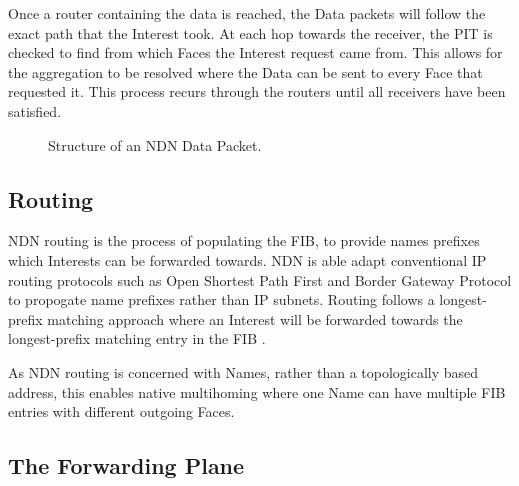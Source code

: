 \documentclass[12pt]{report}
\begin{document}
Once a router containing the data is reached, the Data packets will follow the exact path that the Interest took. At each hop towards the receiver, the PIT is checked to find from which Faces the Interest request came from. This allows for the aggregation to be resolved where the Data can be sent to every Face that requested it. This process recurs through the routers until all receivers have been satisfied.\cite{zhang_named_2014}
\begin{figure}[h!]
    \centering
    \caption{Structure of an NDN Data Packet. \cite{zhang_named_2014}}
    \label{fig:data_packet}
\end{figure}



\subsection{Routing}
NDN routing is the process of populating the FIB, to provide names prefixes which Interests can be forwarded towards. NDN is able adapt conventional IP routing protocols such as Open Shortest Path First and Border Gateway Protocol to propogate name prefixes rather than IP subnets. Routing follows a longest-prefix matching approach where an Interest will be forwarded towards the longest-prefix matching entry in the FIB \cite{zhang_named_2014}.

As NDN routing is concerned with Names, rather than a topologically based address, this enables native multihoming where one Name can have multiple FIB entries with different outgoing Faces.

\subsection{The Forwarding Plane}
\end{document}
